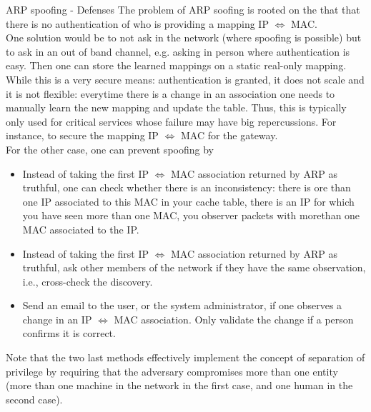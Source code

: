 \begin{parag}{ARP spoofing - Defenses}
    The problem of ARP soofing is rooted on the that that there is no authentication of who is providing a mapping IP $\iff$ MAC.\\
	One solution would be to not ask in the network (where spoofing is possible) but to ask in an out of band channel, e.g. asking in person where authentication is easy. Then one can store the learned mappings on a static real-only mapping. While this is a very secure means: authentication is granted, it does not scale and it is not flexible: everytime there is a change in an association one needs to manually learn the new mapping and update the table. Thus, this is typically only used for critical services whose failure may have big repercussions. For instance, to secure the mapping IP $\iff$ MAC for the gateway.\\
	For the other case, one can prevent spoofing by
	\begin{itemize}
	    \item Instead of taking the first IP $\iff$ MAC association returned by ARP as truthful, one can check whether there is an inconsistency: there is ore than one IP associated to this MAC in your cache table, there is an IP for which you have seen more than one MAC, you observer packets with morethan one MAC associated to the IP.
	    \item Instead of taking the first IP $\iff$ MAC association returned by ARP as truthful, ask other members of the network if they have the same observation, i.e., cross-check the discovery.
	    \item Send an email to the user, or the system administrator, if one observes a change in an IP $\iff$ MAC association. Only validate the change if a person confirms it is correct.
	\end{itemize}
	Note that the two last methods effectively implement the concept of separation of privilege by requiring that the adversary compromises more than one entity (more than one machine in the network in the first case, and one human in the second case).
\end{parag}


